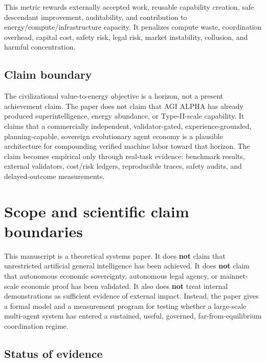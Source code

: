 \documentclass[11pt]{article}
\begin{document}
This metric rewards externally accepted work, reusable capability creation, safe descendant improvement, auditability, and contribution to energy/compute/infrastructure capacity. It penalizes compute waste, coordination overhead, capital cost, safety risk, legal risk, market instability, collusion, and harmful concentration.

\subsection{Claim boundary}\label{claim-boundary}

The civilizational value-to-energy objective is a horizon, not a present achievement claim. The paper does not claim that AGI ALPHA has already produced superintelligence, energy abundance, or Type-II-scale capability. It claims that a commercially independent, validator-gated, experience-grounded, planning-capable, sovereign evolutionary agent economy is a plausible architecture for compounding verified machine labor toward that horizon. The claim becomes empirical only through real-task evidence: benchmark results, external validators, cost/risk ledgers, reproducible traces, safety audits, and delayed-outcome measurements.

\section{Scope and scientific claim boundaries}\label{scope-and-scientific-claim-boundaries}

This manuscript is a theoretical systems paper. It does \textbf{not} claim that unrestricted artificial general intelligence has been achieved. It does \textbf{not} claim that autonomous economic sovereignty, autonomous legal agency, or mainnet-scale economic proof has been validated. It also does \textbf{not} treat internal demonstrations as sufficient evidence of external impact. Instead, the paper gives a formal model and a measurement program for testing whether a large-scale multi-agent system has entered a sustained, useful, governed, far-from-equilibrium coordination regime.

\subsection{Status of evidence}\label{status-of-evidence}
\end{document}
